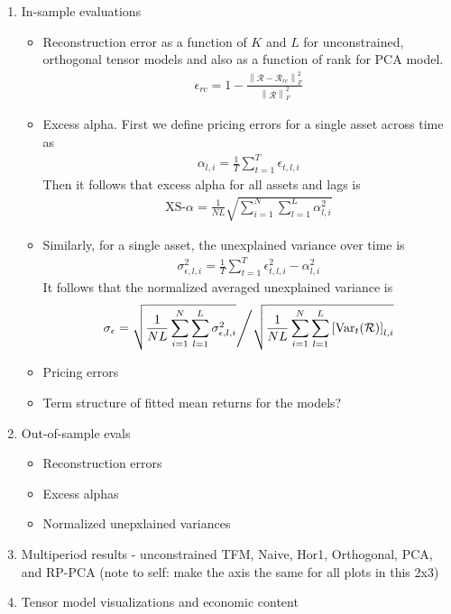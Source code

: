\documentclass{article}
\begin{document}
\begin{enumerate}
    \item In-sample evaluations
    \begin{itemize}
        \item Reconstruction error as a function of $K$ and $L$ for unconstrained, orthogonal tensor models 
        and also as a function of rank for PCA model.
        \begin{align}
            \epsilon_{rc} = 1 - \frac{\left\lVert \mathcal{R} - \mathcal{R}_{rc}\right\lVert^2_F}{\left\lVert \mathcal{R}\right\rVert^2_F}
        \end{align}
        \item Excess alpha. First we define pricing errors for a single asset across time as 
        \begin{align}
            \alpha_{l, i} = \frac{1}{T}\sum_{t=1}^T \epsilon_{t, l, i}
        \end{align}
        Then it follows that excess alpha for all assets and lags is 
        \begin{align}
            \text{XS-}\alpha = \frac{1}{NL}\sqrt{\sum_{i=1}^N \sum_{l=1}^L \alpha^2_{l, i}}
        \end{align}
        \item Similarly, for a single asset, the unexplained variance over time is 
        \begin{align}
            \sigma^2_{\epsilon, l, i} = \frac{1}{T} \sum_{t=1}^T \epsilon^2_{t, l, i} - \alpha^2_{l, i}
        \end{align}
        It follows that the normalized averaged unexplained variance is 
        \begin{align}
            \sigma_{\epsilon} = \sqrt{\frac{1}{NL} \sum_{i=1}^N \sum_{l=1}^L \sigma^2_{\epsilon, l, i}} \Bigg\slash \sqrt{\frac{1}{NL} \sum_{i=1}^N \sum_{l=1}^L \left[\text{Var}_t(\mathcal{R})\right]_{l, i}}
        \end{align}
        \item Pricing errors
        \item Term structure of fitted mean returns for the models?
    \end{itemize}
    \item Out-of-sample evals
    \begin{itemize}
        \item Reconstruction errors
        \item Excess alphas
        \item Normalized unepxlained variances
    \end{itemize}
    \item Multiperiod results - unconstrained TFM, Naive, Hor1, Orthogonal, PCA, and RP-PCA (note to self: make the axis the same for all plots in this 2x3)
    \item Tensor model visualizations and economic content
\end{enumerate}
\end{document}
